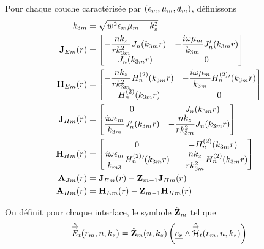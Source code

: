         \begin{defn}
            Pour chaque couche caractérisée par $(\epsilon_m,\mu_m,d_m)$, définissons
            \begin{subequations}
                \begin{align}
                    k_{3m} &= \sqrt{w^2\epsilon_m\mu_m - k_z^2}
                    \\
                    \mathbf{J}_{Em}(r) &= 
                        \begin{bmatrix}
                            -\dfrac{nk_z}{rk_{3m}^2}J_n(k_{3m}r) & -\dfrac{i\omega\mu_m}{k_{3m}}J_n'(k_{3m}r)
                            \\
                            J_n(k_{3m}r) & 0
                        \end{bmatrix}
                    \\
                    \mathbf{H}_{Em}(r) &= 
                        \begin{bmatrix}
                            -\dfrac{nk_z}{rk_{3m}^2}H_n^{(2)}(k_{3m}r) & -\dfrac{i\omega\mu_m}{k_{3m}}H_n^{(2)}{}'(k_{3m}r)
                            \\
                            H_n^{(2)}(k_{3m}r) & 0
                        \end{bmatrix}
                    \\
                    \mathbf{J}_{Hm}(r) &= 
                        \begin{bmatrix}
                            0 & -J_n(k_{3m}r)
                            \\
                            \dfrac{i\omega\epsilon_m}{k_{3m}}J_n'(k_{3m}r) & -\dfrac{nk_z}{rk_{3m}^2}J_n(k_{3m}r)
                        \end{bmatrix}
                    \\
                    \mathbf{H}_{Hm}(r) &= 
                        \begin{bmatrix}
                            0 & -H_n^{(2)}(k_{3m}r)
                            \\
                            \dfrac{i\omega\epsilon_m}{k_{m3}}H_n^{(2)}{}'(k_{3m}r) & -\dfrac{nk_z}{rk_{3m}^2}H_n^{(2)}(k_{3m}r)
                        \end{bmatrix}
                    \\
                    \mathbf{A}_{Jm}(r) &= \mathbf{J}_{Em}(r) -  \mathbf{Z}_{m-1} \mathbf{J}_{Hm}(r)
                    \\
                    \mathbf{A}_{Hm}(r) &= \mathbf{H}_{Em}(r) -  \mathbf{Z}_{m-1} \mathbf{H}_{Hm}(r)
                \end{align}
            \end{subequations}

            On définit pour chaque interface, le symbole $\hat {\mathbf{Z}}_m$ tel que 
            \begin{equation}
                \hat {{\overset{\rightarrow}{E}}}_t(r_m,n,k_z) = \hat {\mathbf{Z}}_m(n,k_z) \left(\underline{e_r} \wedge \hat {{\overset{\rightarrow}{\mathcal{H}}}}_t(r_m,n,k_z)\right)
            \end{equation}
        \end{defn}

